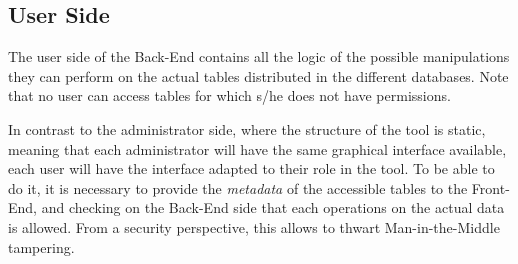 


\clearpage

\subsection*{User Side}
The user side of the Back-End contains all the logic of the possible manipulations they can perform on the actual tables distributed in the different databases. Note that no user can access tables for which s/he does not have permissions.  

In contrast to the administrator side, where the structure of the tool is static, meaning that each administrator will have the same graphical interface available, each user will have the interface adapted to their role in the tool. 
To be able to do it, it is necessary to provide the \emph{metadata} of the accessible tables to the Front-End, and checking on the Back-End side that each operations on the actual data is allowed. From a security perspective, this allows to thwart Man-in-the-Middle tampering.


